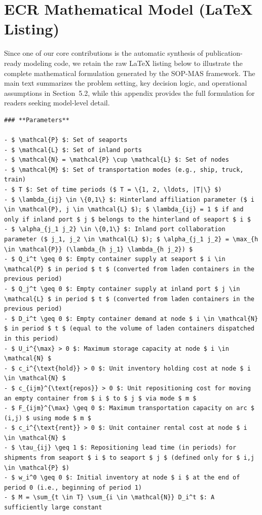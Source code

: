 \documentclass[preprint,12pt]{elsarticle}
\begin{document}
\section{ECR Mathematical Model (LaTeX Listing)}\label{app3}
Since one of our core contributions is the automatic synthesis of publication-ready modeling code, we retain the raw LaTeX listing below to illustrate the complete mathematical formulation generated by the SOP-MAS framework. The main text summarizes the problem setting, key decision logic, and operational assumptions in Section~5.2, while this appendix provides the full formulation for readers seeking model-level detail.
\begin{nolinenumbers}
\begin{promptbox}
\begin{lstlisting}[style=prompttemplate]
### **Parameters**

- $ \mathcal{P} $: Set of seaports
- $ \mathcal{L} $: Set of inland ports
- $ \mathcal{N} = \mathcal{P} \cup \mathcal{L} $: Set of nodes
- $ \mathcal{M} $: Set of transportation modes (e.g., ship, truck, train)
- $ T $: Set of time periods ($ T = \{1, 2, \ldots, |T|\} $)
- $ \lambda_{ij} \in \{0,1\} $: Hinterland affiliation parameter ($ i \in \mathcal{P}, j \in \mathcal{L} $); $ \lambda_{ij} = 1 $ if and only if inland port $ j $ belongs to the hinterland of seaport $ i $
- $ \alpha_{j_1 j_2} \in \{0,1\} $: Inland port collaboration parameter ($ j_1, j_2 \in \mathcal{L} $); $ \alpha_{j_1 j_2} = \max_{h \in \mathcal{P}} (\lambda_{h j_1} \lambda_{h j_2}) $
- $ Q_i^t \geq 0 $: Empty container supply at seaport $ i \in \mathcal{P} $ in period $ t $ (converted from laden containers in the previous period)
- $ Q_j^t \geq 0 $: Empty container supply at inland port $ j \in \mathcal{L} $ in period $ t $ (converted from laden containers in the previous period)
- $ D_i^t \geq 0 $: Empty container demand at node $ i \in \mathcal{N} $ in period $ t $ (equal to the volume of laden containers dispatched in this period)
- $ U_i^{\max} > 0 $: Maximum storage capacity at node $ i \in \mathcal{N} $
- $ c_i^{\text{hold}} > 0 $: Unit inventory holding cost at node $ i \in \mathcal{N} $
- $ c_{ijm}^{\text{repos}} > 0 $: Unit repositioning cost for moving an empty container from $ i $ to $ j $ via mode $ m $
- $ F_{ijm}^{\max} \geq 0 $: Maximum transportation capacity on arc $ (i,j) $ using mode $ m $
- $ c_i^{\text{rent}} > 0 $: Unit container rental cost at node $ i \in \mathcal{N} $
- $ \tau_{ij} \geq 1 $: Repositioning lead time (in periods) for shipments from seaport $ i $ to seaport $ j $ (defined only for $ i,j \in \mathcal{P} $)
- $ w_i^0 \geq 0 $: Initial inventory at node $ i $ at the end of period 0 (i.e., beginning of period 1)
- $ M = \sum_{t \in T} \sum_{i \in \mathcal{N}} D_i^t $: A sufficiently large constant


\end{lstlisting}
\end{promptbox}
\end{nolinenumbers}
\end{document}
